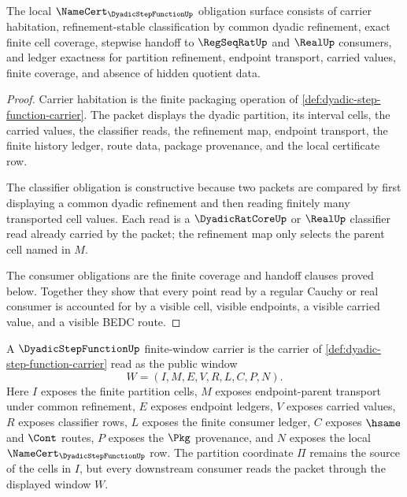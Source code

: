\begin{theorem}
\label{thm:dyadic-step-function-namecert-obligations}
The local $\NameCert_{\DyadicStepFunctionUp}$ obligation surface consists of carrier habitation, refinement-stable classification by common dyadic refinement, exact finite cell coverage, stepwise handoff to $\RegSeqRatUp$ and $\RealUp$ consumers, and ledger exactness for partition refinement, endpoint transport, carried values, finite coverage, and absence of hidden quotient data.
\end{theorem}
\begin{proof}
Carrier habitation is the finite packaging operation of \autoref{def:dyadic-step-function-carrier}. The packet displays the dyadic partition, its interval cells, the carried values, the classifier reads, the refinement map, endpoint transport, the finite history ledger, route data, package provenance, and the local certificate row.

The classifier obligation is constructive because two packets are compared by first displaying a common dyadic refinement and then reading finitely many transported cell values. Each read is a $\DyadicRatCoreUp$ or $\RealUp$ classifier read already carried by the packet; the refinement map only selects the parent cell named in $M$.

The consumer obligations are the finite coverage and handoff clauses proved below. Together they show that every point read by a regular Cauchy or real consumer is accounted for by a visible cell, visible endpoints, a visible carried value, and a visible BEDC route.
\end{proof}

\begin{definition}
\label{def:dyadic-step-function-window-carrier}
A $\DyadicStepFunctionUp$ finite-window carrier is the carrier of \autoref{def:dyadic-step-function-carrier} read as the public window
$$
W=(I,M,E,V,R,L,C,P,N).
$$
Here $I$ exposes the finite partition cells, $M$ exposes endpoint-parent transport under common refinement, $E$ exposes endpoint ledgers, $V$ exposes carried values, $R$ exposes classifier rows, $L$ exposes the finite consumer ledger, $C$ exposes $\hsame$ and $\Cont$ routes, $P$ exposes the $\Pkg$ provenance, and $N$ exposes the local $\NameCert_{\DyadicStepFunctionUp}$ row. The partition coordinate $\Pi$ remains the source of the cells in $I$, but every downstream consumer reads the packet through the displayed window $W$.
\end{definition}

